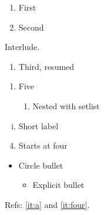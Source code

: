 \documentclass{article}
\begin{document}
\begin{enumerate}[label=(\alph*)]
  \item First\label{it:a}
  \item Second
\end{enumerate}
Interlude.
\begin{enumerate}[resume*]
  \item Third, resumed
\end{enumerate}
\begin{enumerate}[start=5, label=\Roman*.]
  \item Five
  \begin{enumerate}
    \item Nested with setlist
  \end{enumerate}
\end{enumerate}
\begin{enumerate}[i)]
  \item Short label
\end{enumerate}
\begin{enumerate}
  \setcounter{enumi}{3}
  \item Starts at four\label{it:four}
\end{enumerate}
\begin{itemize}
  \item Circle bullet
  \begin{itemize}[label=\textbullet]
    \item Explicit bullet
  \end{itemize}
\end{itemize}
Refs: \ref{it:a} and \ref{it:four}.
\end{document}
